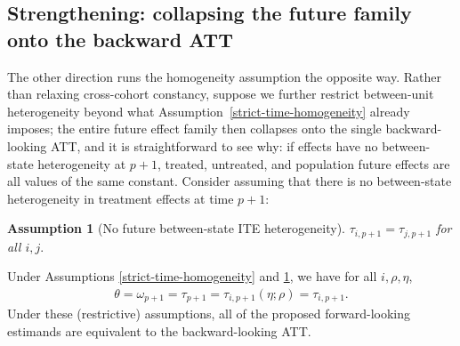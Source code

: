 \documentclass{article}
\newtheorem{assumption}{Assumption}
\begin{document}
\subsection{Strengthening: collapsing the future family onto the backward ATT}\label{sec:strengthening}

The other direction runs the homogeneity assumption the opposite way. Rather than relaxing cross-cohort constancy, suppose we further restrict between-unit heterogeneity beyond what Assumption~\ref{strict-time-homogeneity} already imposes; the entire future effect family then collapses onto the single backward-looking ATT, and it is straightforward to see why: if effects have no between-state heterogeneity at $p+1$, treated, untreated, and population future effects are all values of the same constant. Consider assuming that there is no between-state heterogeneity in treatment effects at time $p+1$:
\begin{assumption}[No future between-state ITE heterogeneity]
    $\tau_{i,p+1} = \tau_{j,p+1}$ for all $i,j.$\label{strict-between-homogeneity}
\end{assumption}
Under Assumptions \ref{strict-time-homogeneity} and \ref{strict-between-homogeneity}, we have for all $i, \rho, \eta$,
\begin{align*}
    \theta = \omega_{p+1} = \tau_{p+1} = \tau_{i,p+1}(\eta; \rho) = \tau_{i,p+1}.
\end{align*}
Under these (restrictive) assumptions, all of the proposed forward-looking estimands are equivalent to the backward-looking ATT.
\end{document}
